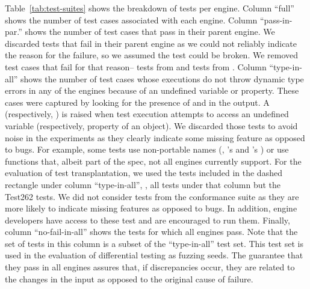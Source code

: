 \documentclass[sigconf,review, anonymous]{acmart}
\begin{document}
Table~\ref{tab:test-suites} shows the breakdown of tests per
engine. Column ``full'' shows the number of test cases associated with
each engine. Column ``pass-in-par.''  shows the number of test cases
that pass in their parent engine. We discarded tests that fail in
their parent engine as we could not reliably indicate the reason for
the failure, so we assumed the test could be broken. We removed \testsThatFail{}
test cases that fail for that reason--\testsThatFailJSC{} tests from \jsc{} and 
\testsThatFailSM{} tests from \smonkey. Column ``type-in-all'' 
shows the number of test cases whose executions do not throw 
dynamic type errors in any of the engines because of an undefined variable or property. 
These cases were captured by looking for the presence of  and
 in the output. A 
(respectively, ) is raised when test execution
attempts to access an undefined variable (respectively, property of an
object). We discarded those tests to avoid noise in the experiments as
they clearly indicate some missing feature as opposed to bugs. For
example, some tests use non-portable names (\eg{}, \jsc{}'s
 and \smonkey{}'s )
or use functions that, albeit part of the spec, not all engines
currently support. For the evaluation of test transplantation, we used
the \totalTestFilesForTestTransplantation{} tests included in the
dashed rectangle under column ``type-in-all'', \ie{}, all tests under
that column but the Test262 tests. We did not consider tests from the
conformance suite as they are more likely to indicate missing features
as opposed to bugs. In addition, engine developers have access to
these test and are encouraged to run them. Finally, column
``no-fail-in-all'' shows the tests for which all engines pass. Note
that the set of tests in this column is a subset of the
``type-in-all'' test set. This test set is used in the evaluation of
differential testing as fuzzing seeds. The guarantee that they pass in
all engines assures that, if discrepancies occur, they are related to
the changes in the input as opposed to the original cause of failure.

\newcommand\marktopleft[1]{%
    \tikz[overlay,remember picture] 
        \node (marker-#1-a) at (0,2ex) {};%
}
\newcommand\markbottomright[1]{%
    \tikz[overlay,remember picture] 
        \node (marker-#1-b) at (0,0) {};%
    \tikz[overlay,remember picture,thick,dashed,inner sep=2pt]
        \node[draw,rectangle,fit=(marker-#1-a.center) (marker-#1-b.center)] {};%
}
\end{document}
